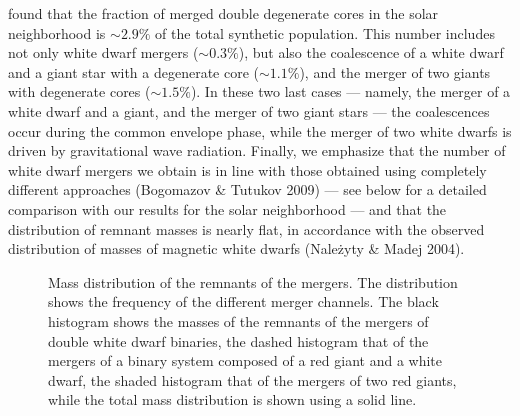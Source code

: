 \documentclass[]{emulateapj}
\begin{document}
found that the fraction of merged double degenerate cores in the solar
neighborhood is $\sim 2.9\%$  of the total synthetic population.  This
number includes not only white  dwarf mergers ($\sim 0.3\%$), but also
the coalescence  of a white dwarf  and a giant star  with a degenerate
core  ($\sim 1.1\%$),  and the  merger of  two giants  with degenerate
cores ($\sim 1.5\%$).  In these  two last cases --- namely, the merger
of a white  dwarf and a giant,  and the merger of two  giant stars ---
the  coalescences occur during  the common  envelope phase,  while the
merger of two white dwarfs  is driven by gravitational wave radiation.
Finally, we emphasize that the number of white dwarf mergers we obtain
is in  line with those obtained using  completely different approaches
(Bogomazov \&  Tutukov 2009) ---  see below for a  detailed comparison
with  our  results  for  the  solar  neighborhood  ---  and  that  the
distribution of remnant masses is  nearly flat, in accordance with the
observed distribution of masses of magnetic white dwarfs (Nale{\.z}yty
\& Madej 2004).

\begin{figure}[t]
\vspace{7.5cm}
\begin{center} 
\caption{Mass  distribution  of  the  remnants  of  the  mergers.  The
         distribution   shows   the   frequency   of   the   different
         merger channels.  The black histogram shows the masses of the
         remnants of  the mergers of double white  dwarf binaries, the
         dashed  histogram that  of  the mergers  of  a binary  system
         composed  of  a red  giant  and  a  white dwarf,  the  shaded
         histogram that  of the mergers  of two red giants,  while the
         total mass distribution is shown using a solid line.}
\end{center}
\label{population} 
\end{figure} 
\end{document}
